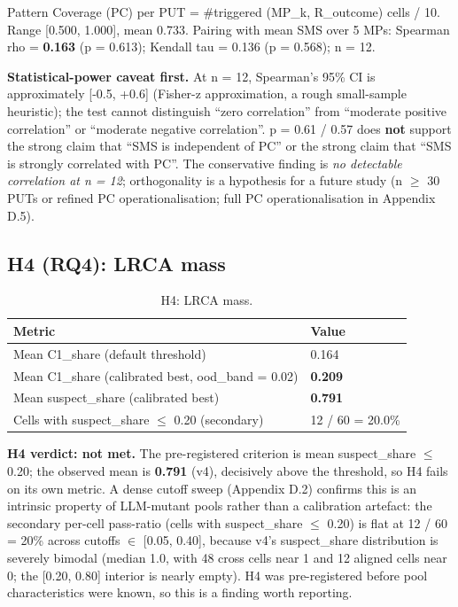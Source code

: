 \documentclass[acmsmall,screen,review]{acmart}
\begin{document}
Pattern Coverage (PC) per PUT = \#triggered (MP\_k, R\_outcome) cells /
10. Range {[}0.500, 1.000{]}, mean 0.733. Pairing with mean SMS over 5
MPs: Spearman rho = \textbf{0.163} (p = 0.613); Kendall tau = 0.136 (p =
0.568); n = 12.

\textbf{Statistical-power caveat first.} At n = 12, Spearman's 95\% CI
is approximately {[}-0.5, +0.6{]} (Fisher-z approximation, a rough
small-sample heuristic); the test cannot distinguish ``zero
correlation'' from ``moderate positive correlation'' or ``moderate
negative correlation''. p = 0.61 / 0.57 does \textbf{not} support the
strong claim that ``SMS is independent of PC'' or the strong claim that
``SMS is strongly correlated with PC''. The conservative finding is
\emph{no detectable correlation at n = 12}; orthogonality is a
hypothesis for a future study (n $\geq$ 30 PUTs or refined PC operationalisation; full PC
operationalisation in Appendix D.5).

\subsection{H4 (RQ4): LRCA mass}\label{h5-lrca-mass}

{\def\LTcaptype{table} %
\begin{longtable}[]{@{}ll@{}}
\caption{H4: LRCA mass.}\label{tab:p2-13}\\
\toprule\noalign{}
Metric & Value \\
\midrule\noalign{}
\endhead
\bottomrule\noalign{}
\endlastfoot
Mean C1\_share (default threshold) & 0.164 \\
Mean C1\_share (calibrated best, ood\_band = 0.02) & \textbf{0.209} \\
Mean suspect\_share (calibrated best) & \textbf{0.791} \\
Cells with suspect\_share $\leq$ 0.20 (secondary) & 12 / 60 = 20.0\% \\
\end{longtable}
}

\textbf{H4 verdict: not met.} The pre-registered criterion is mean
suspect\_share $\leq$ 0.20; the observed mean is \textbf{0.791} (v4),
decisively above the threshold, so H4 fails on its own metric. A dense
cutoff sweep (Appendix D.2) confirms this is an intrinsic property of
LLM-mutant pools rather than a calibration artefact: the secondary
per-cell pass-ratio (cells with suspect\_share $\leq$ 0.20) is flat at
12 / 60 = 20\% across cutoffs $\in$ {[}0.05, 0.40{]}, because v4's
suspect\_share distribution is severely bimodal (median 1.0, with 48
cross cells near 1 and 12 aligned cells near 0; the {[}0.20, 0.80{]}
interior is nearly empty). H4 was pre-registered before pool
characteristics were known, so this is a finding worth reporting.
\end{document}
